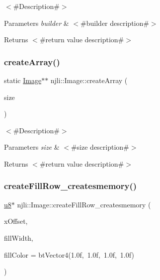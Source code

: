 $<$\#\+Description\#$>$


\begin{DoxyParams}{Parameters}
{\em builder} & $<$\#builder description\#$>$\\
\hline
\end{DoxyParams}
\begin{DoxyReturn}{Returns}
$<$\#return value description\#$>$ 
\end{DoxyReturn}
\mbox{\label{classnjli_1_1_image_ae62db131c7273ee573399de9e63249ab}} 
\subsubsection{\texorpdfstring{create\+Array()}{createArray()}}
{\footnotesize\ttfamily static \mbox{\hyperlink{classnjli_1_1_image}{Image}}$\ast$$\ast$ njli\+::\+Image\+::create\+Array (\begin{DoxyParamCaption}\item[{const \mbox{\hyperlink{_util_8h_a10e94b422ef0c20dcdec20d31a1f5049}{u32}}}]{size }\end{DoxyParamCaption})\hspace{0.3cm}{\ttfamily [static]}}

$<$\#\+Description\#$>$


\begin{DoxyParams}{Parameters}
{\em size} & $<$\#size description\#$>$\\
\hline
\end{DoxyParams}
\begin{DoxyReturn}{Returns}
$<$\#return value description\#$>$ 
\end{DoxyReturn}
\mbox{\label{classnjli_1_1_image_a5d0a48ebc99d07bab0a06967d362fe5c}} 
\subsubsection{\texorpdfstring{create\+Fill\+Row\+\_\+createsmemory()}{createFillRow\_createsmemory()}}
{\footnotesize\ttfamily \mbox{\hyperlink{_util_8h_aed742c436da53c1080638ce6ef7d13de}{u8}}$\ast$ njli\+::\+Image\+::create\+Fill\+Row\+\_\+createsmemory (\begin{DoxyParamCaption}\item[{\mbox{\hyperlink{_util_8h_aa62c75d314a0d1f37f79c4b73b2292e2}{s32}}}]{x\+Offset,  }\item[{\mbox{\hyperlink{_util_8h_aa62c75d314a0d1f37f79c4b73b2292e2}{s32}}}]{fill\+Width,  }\item[{const bt\+Vector4 \&}]{fill\+Color = {\ttfamily btVector4(1.0f,~1.0f,~1.0f,~1.0f)} }\end{DoxyParamCaption})\hspace{0.3cm}{\ttfamily [protected]}}

